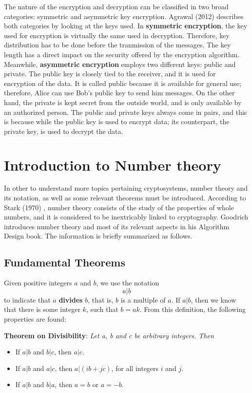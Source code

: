 The nature of the encryption and decryption can be classified in two broad categories: symmetric and asymmetric key encryption. Agrawal (2012) \cite{CryptoKeys} describes both categories by looking at the keys used. In \textbf{symmetric encryption}, the key used for encryption is virtually the same used in decryption. Therefore, key distribution has to be done before the tranmission of the messages. The key length has a direct impact on the security offered by the encryption algorithm. Meanwhile, \textbf{asymmetric encryption} employs two different keys: public and private. The public key is closely tied to the receiver, and it is used for encryption of the data. It is called public because it is available for general use; therefore, Alice can use Bob's public key to send him messages. On the other hand, the private is kept secret from the outside world, and is only available by an authorized person. The public and private keys always come in pairs, and this is because while the public key is used to encrypt data; its counterpart, the private key, is used to decrypt the data. 

\section{Introduction to Number theory}

In other to understand more topics pertaining cryptosystems, number theory and its notation, as well as some relevant theorems must be introduced. According to Stark (1970) \cite{stark1970introduction}, number theory consists of the study of the properties of whole numbers, and it is considered to be inextricably linked to cryptography. Goodrich introduces number theory and most of its relevant aspects in his Algorithm Design \cite{2008algorithm} book. The information is briefly summarized as follows.

\subsection{Fundamental Theorems}

Given positive integers $a$ and $b$, we use the notation 
\[
a|b
\]
to indicate that $a$ \textbf{divides} $b$, that is, $b$ is a multiple of $a$. If $a|b$, then we know that there is some integer $k$, such that $b=ak$. From this definition, the following properties are found:

\textbf{Theorem on Divisibility}: \textit{Let a, b and c be arbitrary integers. Then}
\begin{itemize}
\item If $a|b$ and $b|c$, then $a|c$.
\item If $a|b$ and $a|c$, then $a|(ib+jc)$, for all integers $i$ and $j$.
\item If $a|b$ and $b|a$, then $a=b$ or $a= -b$.
\end{itemize}

